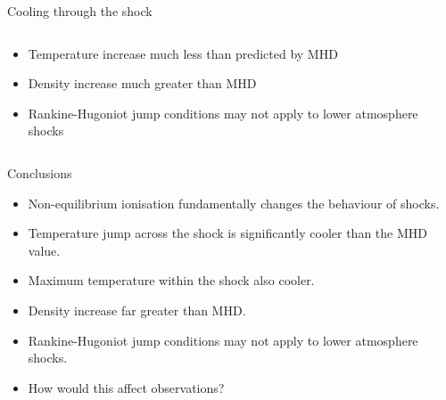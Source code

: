 \documentclass[10pt,aspectratio=169,usenames,dvipsnames]{beamer}
\begin{document}
\begin{frame}{Cooling through the shock}
\begin{columns}
\begin{column}{0.42\textwidth}
\begin{itemize}
    \item Temperature increase much less than predicted by MHD
    \item Density increase much greater than MHD
    \item Rankine-Hugoniot jump conditions may not apply to lower atmosphere shocks
\end{itemize}
\end{column}
\end{columns}
\end{frame}


\begin{frame}{Conclusions}
\begin{itemize}
    \item Non-equilibrium ionisation fundamentally changes the behaviour of shocks.
    \item Temperature jump across the shock is significantly cooler than the MHD value.
    \item Maximum temperature within the shock also cooler.
    \item Density increase far greater than MHD.
    \item Rankine-Hugoniot jump conditions may not apply to lower atmosphere shocks.
    \item How would this affect observations?
\end{itemize}
\end{frame}

\end{document}
